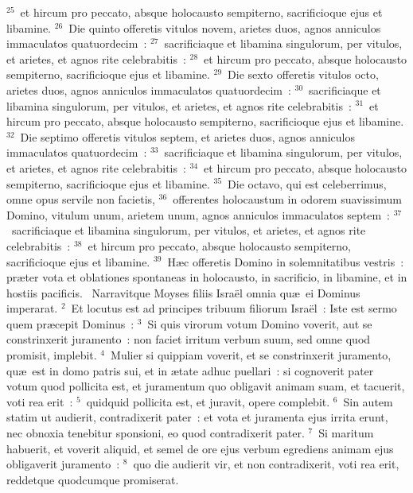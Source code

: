 ${}^{25}$~et hircum pro peccato, absque holocausto sempiterno, sacrificioque ejus et libamine.
${}^{26}$~Die quinto offeretis vitulos novem, arietes duos, agnos anniculos immaculatos quatuordecim~:
${}^{27}$~sacrificiaque et libamina singulorum, per vitulos, et arietes, et agnos rite celebrabitis~:
${}^{28}$~et hircum pro peccato, absque holocausto sempiterno, sacrificioque ejus et libamine.
${}^{29}$~Die sexto offeretis vitulos octo, arietes duos, agnos anniculos immaculatos quatuordecim~:
${}^{30}$~sacrificiaque et libamina singulorum, per vitulos, et arietes, et agnos rite celebrabitis~:
${}^{31}$~et hircum pro peccato, absque holocausto sempiterno, sacrificioque ejus et libamine.
${}^{32}$~Die septimo offeretis vitulos septem, et arietes duos, agnos anniculos immaculatos quatuordecim~:
${}^{33}$~sacrificiaque et libamina singulorum, per vitulos, et arietes, et agnos rite celebrabitis~:
${}^{34}$~et hircum pro peccato, absque holocausto sempiterno, sacrificioque ejus et libamine.
${}^{35}$~Die octavo, qui est celeberrimus, omne opus servile non facietis,
${}^{36}$~offerentes holocaustum in odorem suavissimum Domino, vitulum unum, arietem unum, agnos anniculos immaculatos septem~:
${}^{37}$~sacrificiaque et libamina singulorum, per vitulos, et arietes, et agnos rite celebrabitis~:
${}^{38}$~et hircum pro peccato, absque holocausto sempiterno, sacrificioque ejus et libamine.
${}^{39}$~H\ae c offeretis Domino in solemnitatibus vestris~: pr\ae ter vota et oblationes spontaneas in holocausto, in sacrificio, in libamine, et in hostiis pacificis.
~\lettrine[lines=10,image=true,loversize=0.05,lraise=-0.03]{N}{}arravitque Moyses filiis Isra\"el omnia qu\ae\ ei Dominus imperarat.
${}^{2}$~Et locutus est ad principes tribuum filiorum Isra\"el~: Iste est sermo quem pr\ae cepit Dominus~:
${}^{3}$~Si quis virorum votum Domino voverit, aut se constrinxerit juramento~: non faciet irritum verbum suum, sed omne quod promisit, implebit.
${}^{4}$~Mulier si quippiam voverit, et se constrinxerit juramento, qu\ae\ est in domo patris sui, et in \ae tate adhuc puellari~: si cognoverit pater votum quod pollicita est, et juramentum quo obligavit animam suam, et tacuerit, voti rea erit~:
${}^{5}$~quidquid pollicita est, et juravit, opere complebit.
${}^{6}$~Sin autem statim ut audierit, contradixerit pater~: et vota et juramenta ejus irrita erunt, nec obnoxia tenebitur sponsioni, eo quod contradixerit pater.
${}^{7}$~Si maritum habuerit, et voverit aliquid, et semel de ore ejus verbum egrediens animam ejus obligaverit juramento~:
${}^{8}$~quo die audierit vir, et non contradixerit, voti rea erit, reddetque quodcumque promiserat.
